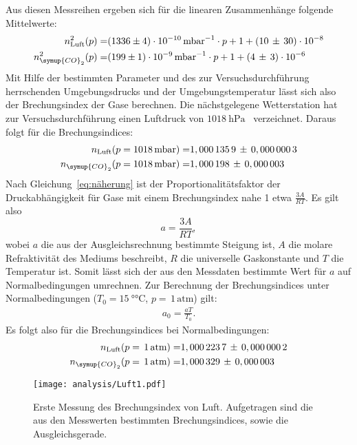 Aus diesen Messreihen ergeben sich für die linearen Zusammenhänge
folgende Mittelwerte:
%
\begin{align*}
  n^2_\text{Luft}(p)=&\SI{1336(4)e-10}{\milli\bar^{-1}}\cdot p + 1 + (10\,\pm\,30)\cdot 10^{-8} \\
  n^2_{\symup{CO}_2}(p)=&\SI{199(1)e-9}{\milli\bar^{-1}}\cdot p + 1 + (4\,\pm\,3)\cdot 10^{-6}
\end{align*}
%
Mit Hilfe der bestimmten Parameter und des zur Versuchsdurchführung herrschenden
Umgebungsdrucks und der Umgebungstemperatur lässt sich also der Brechungsindex der Gase
berechnen. Die nächstgelegene Wetterstation hat zur Versuchsdurchführung einen
Luftdruck von $\SI{1018}{\hecto\pascal}$~\cite{wetteronline} verzeichnet. Daraus folgt
für die Brechungsindices:
\begin{align*}
  n_\text{Luft}(p=\SI{1018}{\milli\bar})=& 1,000\,135\,9\,\pm\,0,000\,000\,3 \\
  n_{\symup{CO}_2}(p=\SI{1018}{\milli\bar})=& 1,000\,198\,\pm\,0,000\,003
\end{align*}
%
Nach Gleichung~\eqref{eq:näherung} ist der Proportionalitätsfaktor
der Druckabhängigkeit für Gase mit einem Brechungsindex nahe 1 etwa
$\frac{3A}{RT}$. Es gilt also
%
\begin{equation}
  a=\frac{3A}{RT},
\end{equation}
%
wobei $a$ die aus der Ausgleichsrechnung bestimmte Steigung ist, $A$ die molare Refraktivität des Mediums beschreibt, $R$ die universelle Gaskonstante und $T$ die Temperatur ist. Somit lässt sich der aus den Messdaten bestimmte Wert für $a$ auf Normalbedingungen umrechnen. Zur Berechnung der Brechungsindices unter Normalbedingungen ($T_0=\SI{15}{\degree\celsius}$, $p=\,1\,\text{atm}$) gilt:
%
\begin{align*}
  a_0=\frac{aT}{T_0} .
\end{align*}
%
Es folgt also für die Brechungsindices bei Normalbedingungen:
%
\begin{align*}
  n_\text{Luft}(p=\,1\,\text{atm})=& 1,000\,223\,7\,\pm\,0,000\,000\,2 \\
  n_{\symup{CO}_2}(p=\,1\,\text{atm})=& 1,000\,329\,\pm\,0,000\,003
\end{align*}
%

\begin{figure}[htb]
  \centering
  \texttt{[image: analysis/Luft1.pdf]}
  \caption{Erste Messung des Brechungsindex von Luft. Aufgetragen sind die aus den Messwerten bestimmten Brechungsindices, sowie die Ausgleichsgerade.}
  \label{fig:luft1}
\end{figure}%

